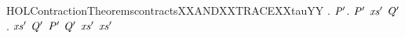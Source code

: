 \newcommand{\HOLContractionTheoremscontractsXXANDXXTRACEXXtau}{\UseVerbatim{HOLContractionTheoremscontractsXXANDXXTRACEXXtau}}
\begin{SaveVerbatim}{HOLContractionTheoremscontractsXXANDXXTRACEXXtauYY}
\HOLTokenTurnstile{} \HOLSymConst{\HOLTokenForall{}} .
          \HOLSymConst{\HOLTokenImp{}}
       \HOLSymConst{\HOLTokenForall{}} \ensuremath{\HOLBoundVar{P}\sp{\prime}}.
              \ensuremath{\HOLBoundVar{P}\sp{\prime}} \HOLSymConst{\HOLTokenConj{}}   \HOLSymConst{\HOLTokenImp{}}
           \HOLSymConst{\HOLTokenExists{}}\ensuremath{\HOLBoundVar{xs}\sp{\prime}} \ensuremath{\HOLBoundVar{Q}\sp{\prime}}.
                 \ensuremath{\HOLBoundVar{xs}\sp{\prime}} \ensuremath{\HOLBoundVar{Q}\sp{\prime}} \HOLSymConst{\HOLTokenConj{}} \ensuremath{\HOLBoundVar{P}\sp{\prime}}  \ensuremath{\HOLBoundVar{Q}\sp{\prime}} \HOLSymConst{\HOLTokenConj{}}
                \ensuremath{\HOLBoundVar{xs}\sp{\prime}} \HOLSymConst{\HOLTokenLeq{}}   \HOLSymConst{\HOLTokenConj{}}  \ensuremath{\HOLBoundVar{xs}\sp{\prime}}
\end{SaveVerbatim}
\newcommand{\HOLContractionTheoremscontractsXXANDXXTRACEXXtauYY}{\UseVerbatim{HOLContractionTheoremscontractsXXANDXXTRACEXXtauYY}}
